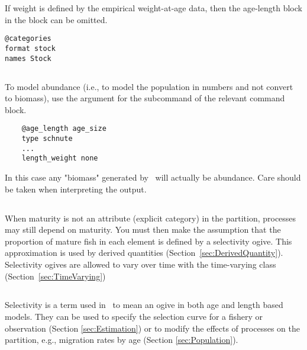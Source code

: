If weight is defined by the empirical weight-at-age data, then the age-length block in the  block can be omitted.

{\small{\begin{verbatim}
@categories
format stock
names Stock
\end{verbatim}}}

\subsection{\label{sec:weightless-model}}

To model abundance (i.e., to model the population in numbers and not convert to biomass), use the argument  for the subcommand  of the relevant   command block.

{\small{\begin{verbatim}
	@age_length age_size
	type schnute
	...
	length_weight none
	\end{verbatim}}}

In this case any "biomass" generated by \CNAME\ will actually be abundance. Care should be taken when interpreting the output.
\fi %

\subsection{\label{sec:maturity-notinpartition}}

When maturity is not an attribute (explicit category) in the partition, processes may still depend on maturity. You must then make the assumption that the proportion of mature fish in each element is defined by a selectivity ogive. This approximation is used by derived quantities (Section~\ref{sec:DerivedQuantity}). Selectivity ogives are allowed to vary over time with the time-varying class (Section~\ref{sec:TimeVarying})

\subsection{\label{sec:Selectivity}}

Selectivity is a term used in \CNAME\ to mean an ogive in both age and length based models. They can be used to specify the selection curve for a fishery or observation  (Section \ref{sec:Estimation}) or to modify the effects of processes on the partition, e.g., migration rates by age (Section \ref{sec:Population}). 

